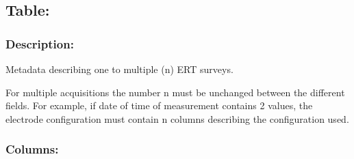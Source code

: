 \documentclass[letterpaper,10pt,english]{sphinxmanual}
\begin{document}
\subsection{Table: }
\label{\detokenize{schema_documentation:table-ert-metadata}}

\subsubsection{Description:}
\label{\detokenize{schema_documentation:description-2}}\label{\detokenize{schema_documentation:id15}}
\sphinxAtStartPar
Metadata describing one to multiple (n) ERT surveys.

\sphinxAtStartPar
For multiple acquisitions the number n must be unchanged between the
different fields. For example, if date of time of measurement contains 2
values, the electrode configuration must contain n columns describing
the configuration used.


\subsubsection{Columns:}
\label{\detokenize{schema_documentation:columns-3}}\label{\detokenize{schema_documentation:id16}}
\end{document}
